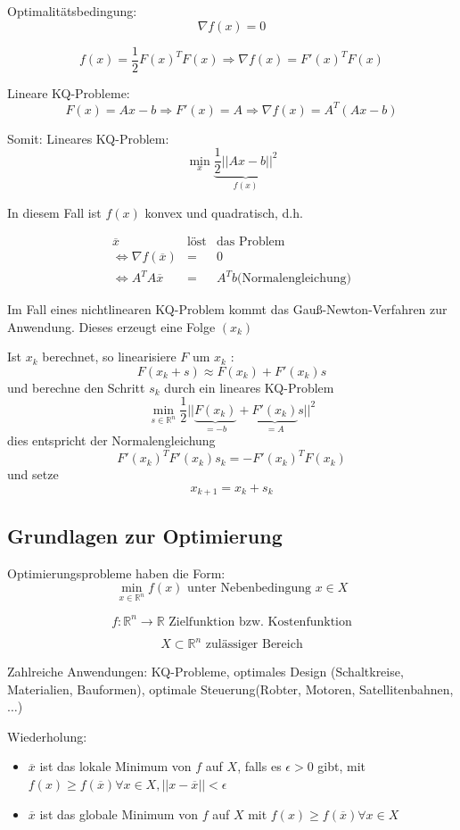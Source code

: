 \documentclass[10pt,a4paper]{article}
\begin{document}
\begin{bsp}
Optimalitätsbedingung: $$\nabla f(x)=0$$

$$f(x)=\frac{1}{2} F(x)^{T}F(x) \Rightarrow \nabla f(x)=F'(x)^{T}F(x)$$


Lineare KQ-Probleme: $$F(x)=Ax-b \Rightarrow F'(x)=A \Rightarrow \nabla f(x)= A^{T}(Ax-b)$$

Somit: Lineares KQ-Problem:
$$\min\limits_{x} \underbrace{\frac{1}{2}||Ax-b||^{2}}_{f(x)}$$

In diesem Fall ist $f(x)$ konvex und quadratisch, d.h. 

\begin{eqnarray*}
\overline{x} &\text{löst}& \text{das Problem} \\
 \Leftrightarrow \nabla f(\overline{x})&=&0 \\
 \Leftrightarrow A^{T}A \overline{x}&=&A^{T}b \text{(Normalengleichung)}
\end{eqnarray*}

Im Fall eines nichtlinearen KQ-Problem kommt das Gauß-Newton-Verfahren zur Anwendung. Dieses erzeugt eine Folge $(x_k)$

Ist $x_k$ berechnet, so linearisiere $F$ um $x_k$ : $$F(x_k+s) \approx F(x_k) + F'(x_k)s$$ und berechne den Schritt $s_k$ durch ein lineares KQ-Problem $$\min\limits_{s \in \mathbb{R}^{n}} \frac{1}{2}||\underbrace{F(x_k)}_{=-b}+\underbrace{F'(x_k)}_{=A}s||^{2}$$ dies entspricht der Normalengleichung $$F'(x_k)^{T}F'(x_k)s_k = - F'(x_k)^{T}F(x_k)$$ und setze $$x_{k+1}=x_k+s_k$$
\end{bsp}

\subsection{Grundlagen zur Optimierung}
Optimierungsprobleme haben die Form: $$\min\limits_{x \in \mathbb{R}^{n}} f(x) \text{ unter Nebenbedingung } x \in X $$

$$f: \mathbb{R}^{n} \rightarrow \mathbb{R} \text{ Zielfunktion bzw. Kostenfunktion}$$

$$X \subset \mathbb{R}^{n} \text{ zulässiger Bereich}$$

Zahlreiche Anwendungen: KQ-Probleme, optimales Design (Schaltkreise, Materialien, Bauformen), optimale Steuerung(Robter, Motoren, Satellitenbahnen,$\ldots$)


Wiederholung: 
\begin{itemize}
\item $\overline{x}$ ist das lokale Minimum von $f$ auf $X$, falls es $\epsilon > 0$ gibt, mit $f(x) \geq f(\overline{x}) \forall x \in X, ||x-\overline{x}||<\epsilon$
\item $\overline{x}$ ist das globale Minimum von $f$ auf $X$ mit $f(x) \geq f(\overline{x}) \forall x \in X$
\end{itemize}
\end{document}
